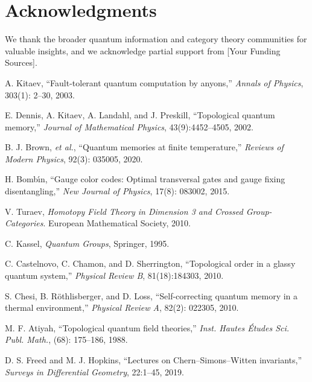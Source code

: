 \documentclass[12pt]{article}
\begin{document}
\section*{Acknowledgments}
We thank the broader quantum information and category theory communities for valuable insights, and we acknowledge partial support from [Your Funding Sources].

\begin{thebibliography}{99}

A. Kitaev,
\newblock ``Fault-tolerant quantum computation by anyons,''
\newblock \emph{Annals of Physics}, 303(1): 2--30, 2003.

E. Dennis, A. Kitaev, A. Landahl, and J. Preskill,
\newblock ``Topological quantum memory,''
\newblock \emph{Journal of Mathematical Physics}, 43(9):4452--4505, 2002.

B. J. Brown, \emph{et al.},
\newblock ``Quantum memories at finite temperature,''
\newblock \emph{Reviews of Modern Physics}, 92(3): 035005, 2020.

H. Bomb\'{\i}n,
\newblock ``Gauge color codes: Optimal transversal gates and gauge fixing disentangling,''
\newblock \emph{New Journal of Physics}, 17(8): 083002, 2015.

V. Turaev,
\newblock \emph{Homotopy Field Theory in Dimension 3 and Crossed Group-Categories}.
\newblock European Mathematical Society, 2010.

C. Kassel,
\newblock \emph{Quantum Groups},
\newblock Springer, 1995.

C. Castelnovo, C. Chamon, and D. Sherrington,
\newblock ``Topological order in a glassy quantum system,''
\newblock \emph{Physical Review B}, 81(18):184303, 2010.

S. Chesi, B. R\"othlisberger, and D. Loss,
\newblock ``Self-correcting quantum memory in a thermal environment,''
\newblock \emph{Physical Review A}, 82(2): 022305, 2010.

M. F. Atiyah,
\newblock ``Topological quantum field theories,''
\newblock \emph{Inst. Hautes \'Etudes Sci. Publ. Math.}, (68): 175--186, 1988.

D. S. Freed and M. J. Hopkins,
\newblock ``Lectures on Chern--Simons--Witten invariants,''
\newblock \emph{Surveys in Differential Geometry}, 22:1--45, 2019.


\end{thebibliography}
\end{document}
